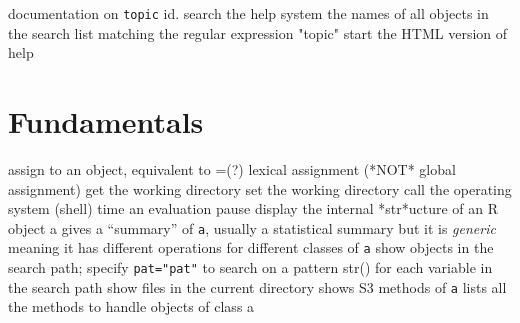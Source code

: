 	{documentation on {\tt topic}
	{id.}
	{search the help system}
	{the names of all objects in the search list
    matching the regular ex\-pres\-sion "to\-pic"}
	{start the HTML version of help}

\section{Fundamentals}{}
\cmdS{<-}	{assign to an object, equivalent to =(?)}
\cmdS{<<-}	{lexical assignment (*NOT* global assignment)}
	{get the working directory}
	{set the working directory}
	{call the operating system (shell)}
	{time an evaluation}
	{pause}
	{display the internal *str*ucture of an R object a}
	{gives a ``summary'' of {\tt a}, usually a statistical summary but it is {\it generic} meaning it has different operations for different classes of {\tt a}}
	{show objects in the search path; specify {\tt pat="pat"} to search on a pattern}
	{str() for each variable in the search path}
	{show files in the current directory}
	{shows S3 methods of {\tt a}}
	{lists all the methods to handle objects of class a}

}
